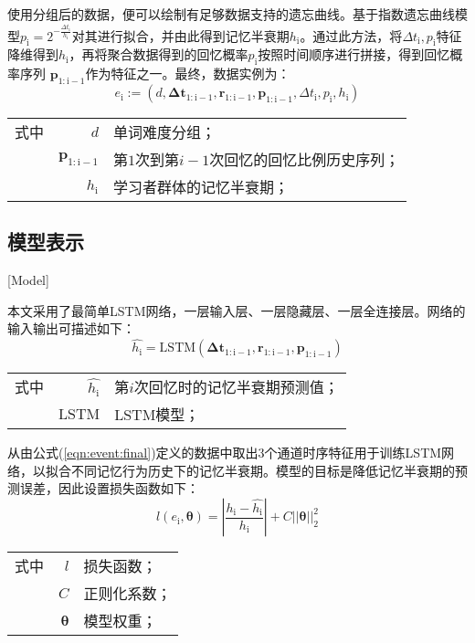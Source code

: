使用分组后的数据，便可以绘制有足够数据支持的遗忘曲线。基于指数遗忘曲线模型$p_\mathrm{i} = 2^{-\frac{\Delta t_\mathrm{i}}{h_\mathrm{i}}}$对其进行拟合，并由此得到记忆半衰期$h_\mathrm{i}$。通过此方法，将$\Delta t_\mathrm{i} , p_\mathrm{i}$特征降维得到$h_\mathrm{i}$，再将聚合数据得到的回忆概率$p_\mathrm{i}$按照时间顺序进行拼接，得到回忆概率序列 $\bm p_\mathrm{1:i-1}$作为特征之一。最终，数据实例为：
\begin{equation}
\label{eqn:event:final}
e_\mathrm{i}:=(d, \bm{\Delta t}_\mathrm{1:i-1}, \bm r_\mathrm{1:i-1}, \bm p_\mathrm{1:i-1}, \Delta t_\mathrm{i} , p_\mathrm{i}, h_\mathrm{i})
\end{equation}
\begin{tabularx}{\textwidth}{@{}l@{\quad}r@{———}X@{}}
    式中& $d$ &单词难度分组；\\
    &  $\bm p_\mathrm{1:i-1}$ &第$1$次到第$i-1$次回忆的回忆比例历史序列；\\
    &  $h_\mathrm{i}$ &学习者群体的记忆半衰期；
\end{tabularx}\vspace{3.15bp}

\subsection{模型表示}[Model]\label{sec:LSTM}

本文采用了最简单LSTM网络，一层输入层、一层隐藏层、一层全连接层。网络的输入输出可描述如下：
\begin{equation}
\hat{h_\mathrm{i}}=\mathrm{LSTM}(\bm{\Delta t}_\mathrm{1:i-1}, \bm r_\mathrm{1:i-1}, \bm p_\mathrm{1:i-1})
\end{equation}
\begin{tabularx}{\textwidth}{@{}l@{\quad}r@{———}X@{}}
    式中&  $\hat{h_\mathrm{i}}$ &第$i$次回忆时的记忆半衰期预测值；\\
    &  $\mathrm{LSTM}$ &LSTM模型；
\end{tabularx}\vspace{3.15bp}

从由公式(\ref{eqn:event:final})定义的数据中取出3个通道时序特征用于训练LSTM网络，以拟合不同记忆行为历史下的记忆半衰期。模型的目标是降低记忆半衰期的预测误差，因此设置损失函数如下：
\begin{equation}
l(e_\mathrm{i},\bm\theta)=|\frac{h_\mathrm{i}-\hat{h_\mathrm{i}}}{h_\mathrm{i}}|+C||\bm\theta||_{2}^{2}
\end{equation}
\begin{tabularx}{\textwidth}{@{}l@{\quad}r@{———}X@{}}
    式中& $l$ &损失函数；\\
    &  $C$ &正则化系数；\\
    &  $\bm\theta$ &模型权重；
\end{tabularx}\vspace{3.15bp}

